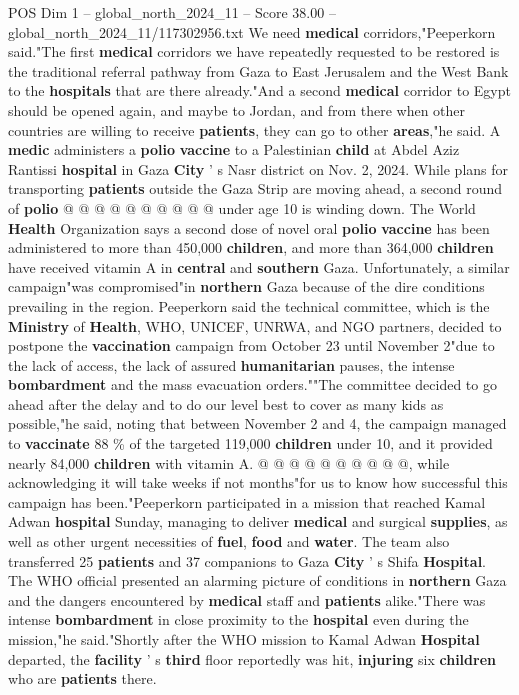 \begin{textsample}{POS Dim 1 – global\_north\_2024\_11 – Score 38.00 – global\_north\_2024\_11/117302956.txt}
We need \textbf{medical} corridors,"Peeperkorn said."The first \textbf{medical} corridors we have repeatedly requested to be restored is the traditional referral pathway from Gaza to East Jerusalem and the West Bank to the \textbf{hospitals} that are there already."And a second \textbf{medical} corridor to Egypt should be opened again, and maybe to Jordan, and from there when other countries are willing to receive \textbf{patients}, they can go to other \textbf{areas},"he said.
A \textbf{medic} administers a \textbf{polio} \textbf{vaccine} to a Palestinian \textbf{child} at Abdel Aziz Rantissi \textbf{hospital} in Gaza \textbf{City} ' s Nasr district on Nov. 2, 2024.
While plans for transporting \textbf{patients} outside the Gaza Strip are moving ahead, a second round of \textbf{polio} @ @ @ @ @ @ @ @ @ @ under age 10 is winding down.
The World \textbf{Health} Organization says a second dose of novel oral \textbf{polio} \textbf{vaccine} has been administered to more than 450,000 \textbf{children}, and more than 364,000 \textbf{children} have received vitamin A in \textbf{central} and \textbf{southern} Gaza.
Unfortunately, a similar campaign"was compromised"in \textbf{northern} Gaza because of the dire conditions prevailing in the region.
Peeperkorn said the technical committee, which is the \textbf{Ministry} of \textbf{Health}, WHO, UNICEF, UNRWA, and NGO partners, decided to postpone the \textbf{vaccination} campaign from October 23 until November 2"due to the lack of access, the lack of assured \textbf{humanitarian} pauses, the intense \textbf{bombardment} and the mass evacuation orders.""The committee decided to go ahead after the delay and to do our level best to cover as many kids as possible,"he said, noting that between November 2 and 4, the campaign managed to \textbf{vaccinate} 88 \% of the targeted 119,000 \textbf{children} under 10, and it provided nearly 84,000 \textbf{children} with vitamin A. @ @ @ @ @ @ @ @ @ @, while acknowledging it will take weeks if not months"for us to know how successful this campaign has been."Peeperkorn participated in a mission that reached Kamal Adwan \textbf{hospital} Sunday, managing to deliver \textbf{medical} and surgical \textbf{supplies}, as well as other urgent necessities of \textbf{fuel}, \textbf{food} and \textbf{water}.
The team also transferred 25 \textbf{patients} and 37 companions to Gaza \textbf{City} ' s Shifa \textbf{Hospital}.
The WHO official presented an alarming picture of conditions in \textbf{northern} Gaza and the dangers encountered by \textbf{medical} staff and \textbf{patients} alike."There was intense \textbf{bombardment} in close proximity to the \textbf{hospital} even during the mission,"he said."Shortly after the WHO mission to Kamal Adwan \textbf{Hospital} departed, the \textbf{facility} ' s \textbf{third} floor reportedly was hit, \textbf{injuring} six \textbf{children} who are \textbf{patients} there.

\end{textsample}
